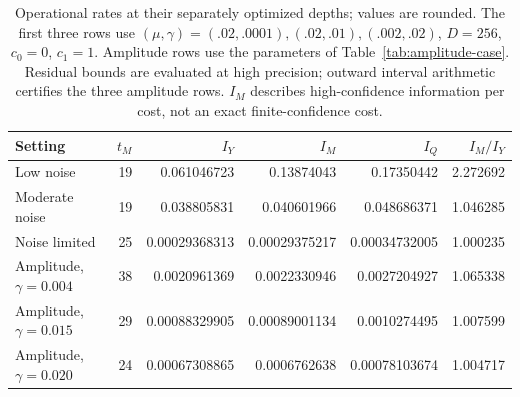 \begin{table}[htbp]
\centering\small
\setlength{\tabcolsep}{4pt}
\begin{tabular}{lrrrrr}
\toprule
Setting & $t_M$ & $I_Y$ & $I_M$ & $I_Q$ & $I_M/I_Y$\\
\midrule
Low noise & 19 & 0.061046723 & 0.13874043 & 0.17350442 & 2.272692\\
Moderate noise & 19 & 0.038805831 & 0.040601966 & 0.048686371 & 1.046285\\
Noise limited & 25 & 0.00029368313 & 0.00029375217 & 0.00034732005 & 1.000235\\
Amplitude, $\gamma=0.004$ & 38 & 0.0020961369 & 0.0022330946 & 0.0027204927 & 1.065338\\
Amplitude, $\gamma=0.015$ & 29 & 0.00088329905 & 0.00089001134 & 0.0010274495 & 1.007599\\
Amplitude, $\gamma=0.020$ & 24 & 0.00067308865 & 0.0006762638 & 0.00078103674 & 1.004717\\
\bottomrule\end{tabular}
\caption{Operational rates at their separately optimized depths; values are rounded.
The first three rows use $(\mu,\gamma)=(.02,.0001),(.02,.01),(.002,.02)$,
$D=256$, $c_0=0$, $c_1=1$. Amplitude rows use the parameters of
Table~\ref{tab:amplitude-case}. Residual bounds are evaluated at high precision;
outward interval arithmetic certifies the three amplitude rows.
$I_M$ describes high-confidence information per cost, not an exact finite-confidence cost.}
\label{tab:operational-rates}
\end{table}
